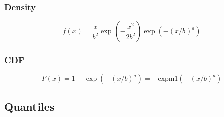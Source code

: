 %
%
%



\subsubsection{Density}
\label{WeibullDistributionDensity}

\begin{equation} 
	f(x)= \frac{x}{b^2} \exp \left(- \frac{x^2}{2b^2}\right) \exp(-(x/b)^a)
\end{equation}


\subsubsection{CDF}

\begin{equation} 
	F(x)= 1 - \exp \left(- (x/b)^a\right)
	= -\text{expm1} \left(- (x/b)^a\right)
\end{equation}



\subsection{Quantiles}

